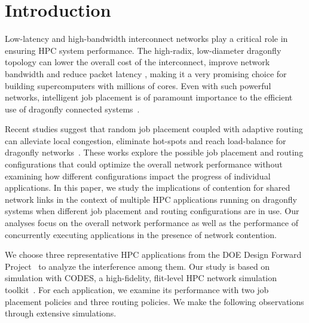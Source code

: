 \section{Introduction}
\label{sec:intro}

Low-latency and high-bandwidth interconnect networks play a critical role in ensuring HPC system performance. 
The high-radix, low-diameter dragonfly topology can lower the overall cost of the interconnect, improve network bandwidth and reduce packet latency \cite{dally-dragonfly}, 
making it a very promising choice for building supercomputers with millions of cores.
Even with such powerful networks, 
intelligent job placement is of paramount importance to the efficient use of dragonfly connected systems~\cite{bhatele2015, jain-sc14}. 

Recent studies suggest that random job placement coupled with adaptive routing can alleviate local congestion, eliminate hot-spots and reach load-balance for dragonfly networks~\cite{jain-sc14, bhatele-sc11, brandt2014}. 
These works explore the possible job placement and routing configurations that could optimize the overall network performance without examining how different configurations impact the progress of individual applications.
In this paper, we study the implications of contention for shared network links in the context of multiple HPC applications running on dragonfly systems when different job placement and routing configurations are in use.
Our analyses focus on the overall network performance as well as the performance of concurrently executing applications in the presence of network contention.



We choose three representative HPC applications from the DOE Design Forward Project~\cite{designforward-webpage} to analyze the interference among them. Our study is based on simulation with CODES, a high-fidelity, flit-level HPC network simulation toolkit~\cite{misbah-tpds}. 
For each application, we examine its performance with two job placement policies and three routing policies.
We make the following observations through extensive simulations.



